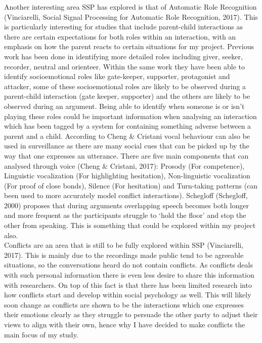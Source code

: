 \documentclass[a4paper,11pt]{report}
\begin{document}
Another interesting area SSP has explored is that of Automatic Role Recognition (Vinciarelli, Social Signal Processing for Automatic Role Recognition, 2017). This is particularly interesting for studies that include parent-child interactions as there are certain expectations for both roles within an interaction, with an emphasis on how the parent reacts to certain situations for my project. Previous work has been done in identifying more detailed roles including giver, seeker, recorder, neutral and orienteer. Within the same work they have been able to identify socioemotional roles like gate-keeper, supporter, protagonist and attacker, some of these socioemotional roles are likely to be observed during a parent-child interaction (gate keeper, supporter) and the others are likely to be observed during an argument. Being able to identify when someone is or isn’t playing these roles could be important information when analysing an interaction which has been tagged by a system for containing something adverse between a parent and a child.
According to Cheng \& Cristani vocal behaviour can also be used in surveillance as there are many social cues that can be picked up by the way that one expresses an utterance. There are five main components that can analysed through voice (Cheng \& Cristani, 2017): Prosody (For competence), Linguistic vocalization (For highlighting hesitation), Non-linguistic vocalization (For proof of close bonds), Silence (For hesitation) and Turn-taking patterns (can been used to more accurately model conflict interactions). Schegloff (Schegloff, 2000) proposes that during arguments overlapping speech becomes both longer and more frequent as the participants struggle to ‘hold the floor’ and stop the other from speaking. This is something that could be explored within my project also.\\

Conflicts are an area that is still to be fully explored within SSP (Vinciarelli, 2017). This is mainly due to the recordings made public tend to be agreeable situations, so the conversations heard do not contain conflicts. As conflicts deals with such personal information there is even less desire to share this information with researchers. On top of this fact is that there has been limited research into how conflicts start and develop within social psychology as well. This will likely soon change as conflicts are shown to be the interactions which one expresses their emotions clearly as they struggle to persuade the other party to adjust their views to align with their own, hence why I have decided to make conflicts the main focus of my study. \\
\end{document}
